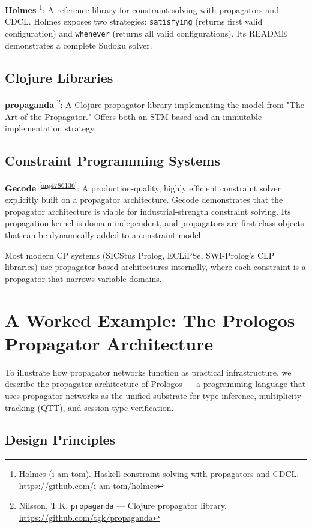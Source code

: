 \documentclass[11pt]{article}
\begin{document}
\textbf{Holmes} \footnote{Holmes (i-am-tom). Haskell constraint-solving with
propagators and CDCL. \url{https://github.com/i-am-tom/holmes}}: A reference library for constraint-solving with
propagators and CDCL. Holmes exposes two strategies: \texttt{satisfying}
(returns first valid configuration) and \texttt{whenever} (returns all valid
configurations). Its README demonstrates a complete Sudoku solver.
\subsection{Clojure Libraries}
\label{sec:org62e9c38}

\textbf{propaganda} \footnote{Nilsson, T.K. \texttt{propaganda} --- Clojure propagator
library. \url{https://github.com/tgk/propaganda}}: A Clojure propagator library implementing
the model from "The Art of the Propagator." Offers both an STM-based
and an immutable implementation strategy.
\subsection{Constraint Programming Systems}
\label{sec:orgcef0018}

\textbf{Gecode} \textsuperscript{\ref{org4786136}}: A production-quality, highly efficient constraint
solver explicitly built on a propagator architecture. Gecode
demonstrates that the propagator architecture is viable for
industrial-strength constraint solving. Its propagation kernel is
domain-independent, and propagators are first-class objects that can be
dynamically added to a constraint model.

Most modern CP systems (SICStus Prolog, ECLiPSe, SWI-Prolog's CLP
libraries) use propagator-based architectures internally, where each
constraint is a propagator that narrows variable domains.
\section{A Worked Example: The Prologos Propagator Architecture}
\label{prologos}
To illustrate how propagator networks function as practical
infrastructure, we describe the propagator architecture of Prologos ---
a programming language that uses propagator networks as the unified
substrate for type inference, multiplicity tracking (QTT), and session
type verification.
\subsection{Design Principles}
\label{sec:org08bf018}
\end{document}

